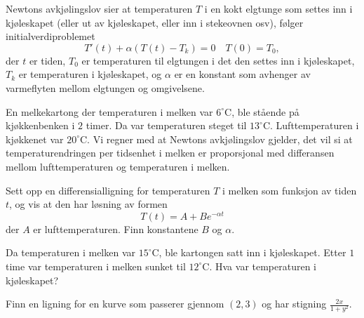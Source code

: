 \documentclass[a4paper,norsk,11pt]{interaktiv}
\begin{document}
\begin{oppgave}{3}
Newtons avkjølingslov sier at temperaturen $T$ i en kokt elgtunge som settes inn i kjøleskapet (eller ut av kjøleskapet, eller inn i stekeovnen osv), 
følger initialverdiproblemet
\[
T'(t)+\alpha \left(T(t)-T_k\right)=0 \quad T(0)=T_0,
\]
der $t$ er tiden, $T_0$ er temperaturen til elgtungen i det den settes inn  i kjøleskapet, 
$T_k$ er temperaturen i kjøleskapet,
og $\alpha$ er en konstant som avhenger av varmeflyten mellom elgtungen og omgivelsene. 

  En melkekartong der temperaturen i melken var $6^\circ$C, ble
  stående på kjøkkenbenken i $2$ timer. Da var temperaturen steget til
  $13^\circ$C. Lufttemperaturen i kjøkkenet var $20^\circ$C. Vi regner
  med at Newtons avkjølingslov gjelder, det vil si at
  temperaturendringen per tidsenhet i melken er proporsjonal med
  differansen mellom lufttemperaturen og temperaturen i melken.

  \bPunkt
    Sett opp en differensialligning for temperaturen $T$ i melken som
    funksjon av tiden $t$, og vis at den har løsning av formen
    \begin{equation*}
      T(t) = A+ Be^{- \alpha t}
    \end{equation*}
    der $A$ er lufttemperaturen. Finn konstantene $B$ og $\alpha$.
  \ePunkt

  \bPunkt
    Da temperaturen i melken var $15^\circ$C, ble kartongen satt
    inn i kjøleskapet. Etter $1$ time var temperaturen i melken sunket
    til $12^\circ$C. Hva var temperaturen i kjøleskapet?
  \ePunkt
\end{oppgave}
%
%

\begin{oppgave}{4}
  Finn en ligning for en kurve som passerer gjennom $(2,3)$ og har
  stigning $\displaystyle\frac{2x}{1+y^2}$.
  \\[6pt]
\end{oppgave}



%
%
\end{document}
